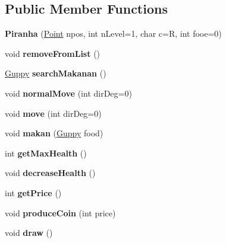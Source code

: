 \subsection*{Public Member Functions}
\begin{DoxyCompactItemize}
\item 
\mbox{\label{class_piranha_ac3745db6d47c7621edb8df6fecb72f10}} 
{\bfseries Piranha} (\mbox{\hyperlink{class_point}{Point}} npos, int n\+Level=1, char c=\textquotesingle{}R\textquotesingle{}, int fooe=0)
\item 
\mbox{\label{class_piranha_a5941759967235fffe0df68de713c6b70}} 
void {\bfseries remove\+From\+List} ()
\item 
\mbox{\label{class_piranha_adde8748e1af8528c6c7ee821bb23bf55}} 
\mbox{\hyperlink{class_guppy}{Guppy}} {\bfseries search\+Makanan} ()
\item 
\mbox{\label{class_piranha_adaf79fb18d3586e95e52c86df76c2d6b}} 
void {\bfseries normal\+Move} (int dir\+Deg=0)
\item 
\mbox{\label{class_piranha_a050a5c2c631e5dd1ccc9ff1df1be5c59}} 
void {\bfseries move} (int dir\+Deg=0)
\item 
\mbox{\label{class_piranha_a0f23372c3333b8a4dd46cb39484760ab}} 
void {\bfseries makan} (\mbox{\hyperlink{class_guppy}{Guppy}} food)
\item 
\mbox{\label{class_piranha_ac53194d591f9b3784a03e7b74f59786b}} 
int {\bfseries get\+Max\+Health} ()
\item 
\mbox{\label{class_piranha_aa7fc8ffb8afb60f1361576c1da72a78f}} 
void {\bfseries decrease\+Health} ()
\item 
\mbox{\label{class_piranha_a0e7ca29c6828fa78684797e2152f6245}} 
int {\bfseries get\+Price} ()
\item 
\mbox{\label{class_piranha_a616f5b5d04cf59b3ca2cb849d696a019}} 
void {\bfseries produce\+Coin} (int price)
\item 
\mbox{\label{class_piranha_a47e9f2f5d2c10f8bd4ee1c15790ee2a3}} 
void {\bfseries draw} ()
\end{DoxyCompactItemize}
